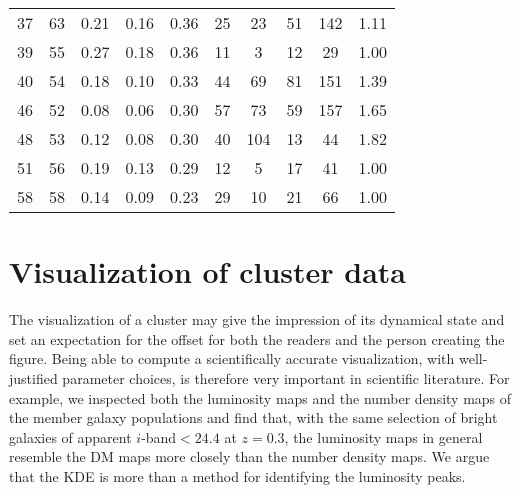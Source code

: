 \documentclass[usenatbib]{mn2e}
\begin{document}
{\begin{table*}
\begin{center}
\begin{tabular}{lccccccccc}
37 &       63 &                             0.21 &                             0.16 &                             0.36 &              25 &              23 &                                 51 &                             142 &       1.11 \\
39 &       55 &                             0.27 &                             0.18 &                             0.36 &              11 &               3 &                                 12 &                              29 &       1.00 \\
40 &       54 &                             0.18 &                             0.10 &                             0.33 &              44 &              69 &                                 81 &                             151 &       1.39 \\
46 &       52 &                             0.08 &                             0.06 &                             0.30 &              57 &              73 &                                 59 &                             157 &       1.65 \\
48 &       53 &                             0.12 &                             0.08 &                             0.30 &              40 &             104 &                                 13 &                              44 &       1.82 \\
51 &       56 &                             0.19 &                             0.13 &                             0.29 &              12 &               5 &                                 17 &                              41 &       1.00 \\
58 &       58 &                             0.14 &                             0.09 &                             0.23 &              29 &              10 &                                 21 &                              66 &       1.00 \\
\bottomrule
\end{tabular}
\end{center}
\end{table*}


\section{Visualization of cluster data} 
\label{app:visualization}
The visualization of a cluster may give the impression of its dynamical state and set an expectation for the offset for both the readers and the person creating the figure. 
Being able to compute a scientifically accurate visualization, with well-justified parameter choices, is therefore very important in scientific literature.
For example, we inspected both the luminosity maps and the number density maps of the member galaxy populations and find that, with the same selection of bright galaxies of apparent $i$-band$ < 24.4$ at
$z=0.3$, the luminosity maps in general resemble the DM maps more closely than the number density maps. We argue that the KDE is more than a method for identifying the luminosity peaks.

}
\end{document}
